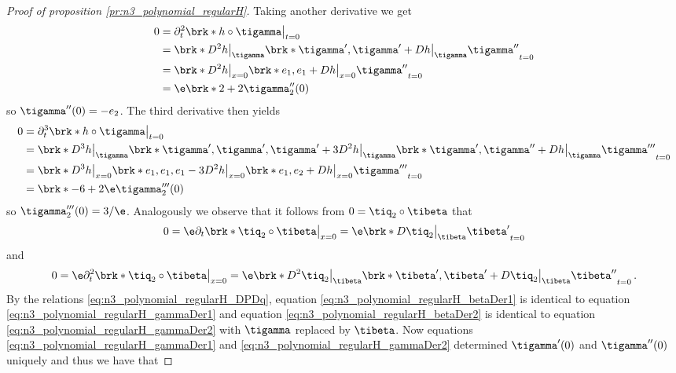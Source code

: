 \begin{proof}[Proof of proposition \ref{pr:n3_polynomial_regularH}]
  Taking another derivative we get
  \begin{align}
    \begin{aligned}
    0&=\partial_t^2\brk*{h\circ\tigamma}\big\vert_{t=0}  \\
    &=\brk*{D^2h\big\vert_{\tigamma}\brk*{\tigamma',\tigamma'}+Dh\big\vert_{\tigamma}\tigamma''}_{t=0} \\
    &=\brk*{D^2h\big\vert_{x=0}\brk*{e_1,e_1}+Dh\big\vert_{x=0}\tigamma''}_{t=0} \\
    &=\e\brk*{2+2\tigamma_2''}(0)
    \end{aligned}
    \label{eq:n3_polynomial_regularH_gammaDer2}
  \end{align}
  so $\tigamma''(0)=-e_2$.
  The third derivative then yields
  \begin{align*}
    0&=\partial_t^3\brk*{h\circ\tigamma}\big\vert_{t=0} \\
    &=\brk*{D^3h\big\vert_{\tigamma}\brk*{\tigamma',\tigamma',\tigamma'}
    +3D^2h\big\vert_{\tigamma}\brk*{\tigamma',\tigamma''}
    +Dh\big\vert_{\tigamma}\tigamma'''}_{t=0} \\
    &=\brk*{D^3h\big\vert_{x=0}\brk*{e_1,e_1,e_1}
    -3D^2h\big\vert_{x=0}\brk*{e_1,e_2}
    +Dh\big\vert_{x=0}\tigamma'''}_{t=0} \\
    &=\brk*{-6+2\e\tigamma_2'''}(0)
  \end{align*}
  so $\tigamma_2'''(0)=3/\e$.
  Analogously we observe that it follows from $0=\tiq_2\circ\tibeta$ that
  \begin{align}
    0=\e\partial_t\brk*{\tiq_2\circ\tibeta}\big\vert_{x=0}
    =\e\brk*{D\tiq_2\big\vert_{\tibeta}\tibeta'}_{t=0}
    \label{eq:n3_polynomial_regularH_betaDer1}
  \end{align}
  and
  \begin{align}
    0=\e\partial_t^2\brk*{\tiq_2\circ\tibeta}\big\vert_{x=0}
    =\e\brk*{D^2\tiq_2\big\vert_{\tibeta}\brk*{\tibeta',\tibeta'}+D\tiq_2\big\vert_{\tibeta}\tibeta''}_{t=0}\,.
    \label{eq:n3_polynomial_regularH_betaDer2}
  \end{align}
  By the relations \eqref{eq:n3_polynomial_regularH_DPDq}, equation \eqref{eq:n3_polynomial_regularH_betaDer1} is identical to
  equation \eqref{eq:n3_polynomial_regularH_gammaDer1} 
  and equation  \eqref{eq:n3_polynomial_regularH_betaDer2} is identical to equation 
  \eqref{eq:n3_polynomial_regularH_gammaDer2} with $\tigamma$ replaced by $\tibeta$.
  Now equations  \eqref{eq:n3_polynomial_regularH_gammaDer1} and  \eqref{eq:n3_polynomial_regularH_gammaDer2}
  determined $\tigamma'(0)$ and $\tigamma''(0)$ uniquely and thus we have that

\end{proof}
